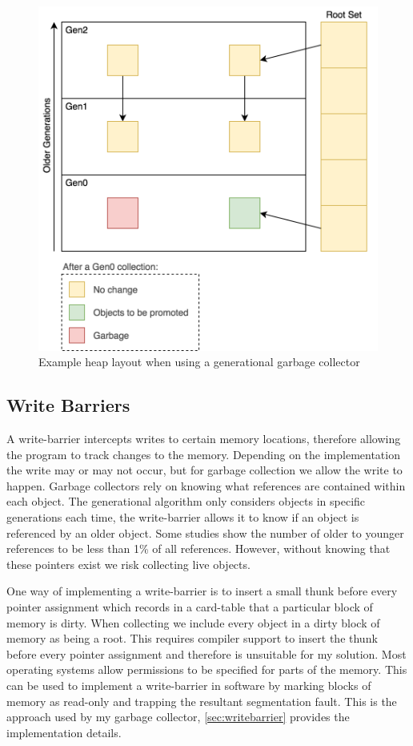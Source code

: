 \documentclass[../diss.tex]{subfiles}
\begin{document}
\begin{figure}
    \centering
    \includegraphics[max width=\linewidth]{figs/generational.png}
    \caption{Example heap layout when using a generational garbage collector}
    \label{fig:generational}
\end{figure}

\subsection{Write Barriers} \label{sec:prepwritebarriers}

A write-barrier\cite{writebarriers} intercepts writes to certain memory locations, therefore allowing the program to track changes to the memory. Depending on the implementation the write may or may not occur, but for garbage collection we allow the write to happen. Garbage collectors rely on knowing what references are contained within each object. The generational algorithm only considers objects in specific generations each time, the write-barrier allows it to know if an object is referenced by an older object. Some studies show the number of older to younger references to be less than 1\% of all references. However, without knowing that these pointers exist we risk collecting live objects.

One way of implementing a write-barrier is to insert a small thunk before every pointer assignment which records in a card-table that a particular block of memory is dirty. When collecting we include every object in a dirty block of memory as being a root. This requires compiler support to insert the thunk before every pointer assignment and therefore is unsuitable for my solution. Most operating systems allow permissions to be specified for parts of the memory. This can be used to implement a write-barrier in software by marking blocks of memory as read-only and trapping the resultant segmentation fault. This is the approach used by my garbage collector, \cref{sec:writebarrier} provides the implementation details.
\end{document}
